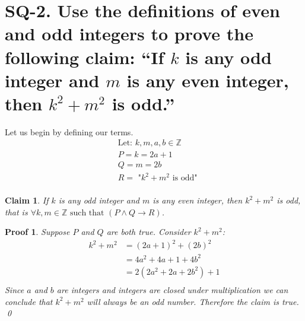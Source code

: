 \documentclass[11pt]{article}
\newtheorem*{claim}{Claim}
\newtheorem*{myproof}{Proof}
\begin{document}
\section*{SQ-2. Use the definitions of even and odd integers to prove the following claim: “If $k$ is any odd integer and $m$ is any even integer, then $k^2+m^2$ is odd.” }
Let us begin by defining our terms.
\begin{align*}
    &\text{Let: } k,m,a,b\in\mathbb{Z} \\
    &P = k = 2a+1 \\
    &Q = m = 2b \\
    &R = \text{ "$k^2+m^2$ is odd"} \\
\end{align*}
\begin{claim}
    If $k$ is any odd integer and $m$ is any even integer, then $k^2+m^2$ is odd, that is $\forall k,m \in \mathbb{Z} \text{ such that } (P \wedge Q \rightarrow R)$.
\end{claim}
\begin{myproof}
    Suppose $P$ and $Q$ are both true. Consider $k^2+m^2$:
    \begin{align*}
        k^2 + m^2 &= (2a+1)^2+(2b)^2 \\
        &= 4a^2+4a+1+4b^2 \\
        &= 2(2a^2+2a+2b^2)+1 \\
    \end{align*}
    Since $a$ and $b$ are integers and integers are closed under multiplication we can conclude that $k^2 + m^2$ will always be an odd number. Therefore the claim is true. \\ 
    \qed
\end{myproof}
\end{document}
